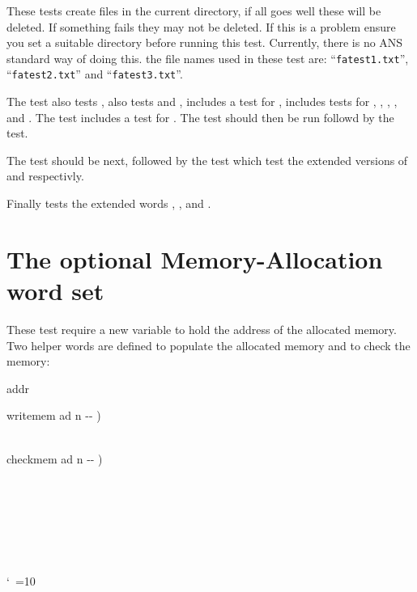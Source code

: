 These tests create files in the current directory, if all goes well
these will be deleted.  If something fails they may not be deleted.
If this is a problem ensure you set a suitable directory before
running this test.  Currently, there is no ANS standard way of doing
this.  the file names used in these test are:
``\texttt{fatest1.txt}'', ``\texttt{fatest2.txt}'' and
``\texttt{fatest3.txt}''.

The test  also tests ,
 also tests  and ,
 includes a test for ,
 includes tests for ,
, , , and
.
The  test includes a test for .
The test  should then be run followd by
the  test.

The  test should be next, followed by
 the test which test the extended versions of
 and  respectivly.

Finally  tests the extended words
, , and .





\section{The optional Memory-Allocation word set} %

These test require a new variable to hold the address of the allocated
memory.  Two helper words are defined to populate the allocated memory
and to check the memory:

\begin{tt}\frenchspacing\obeyspaces
{} addr

\word{:} writemem  ad n -{}- ) \\
         \\
\word{;}

\word{:} checkmem  ad n -{}- ) \\
  \\
\tab[2]     \\
\tab[2]  \\
\tab[2]   \\
\tab {} \\
\tab {} \\
\word{;}
\end{tt}
\nonfrenchspacing\catcode`\ =10

